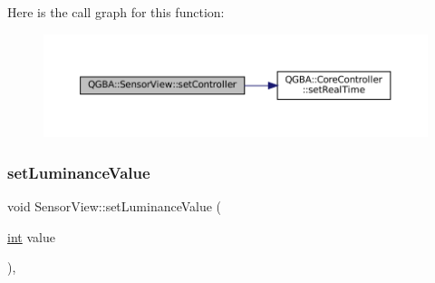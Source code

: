 Here is the call graph for this function\+:
\nopagebreak
\begin{figure}[H]
\begin{center}
\leavevmode
\includegraphics[width=350pt]{class_q_g_b_a_1_1_sensor_view_aef94bd97606a185f823636106bd0b2ca_cgraph}
\end{center}
\end{figure}
\mbox{\label{class_q_g_b_a_1_1_sensor_view_ad6dec39ee47c69c736c18293da18527c}} 
\subsubsection{\texorpdfstring{set\+Luminance\+Value}{setLuminanceValue}}
{\footnotesize\ttfamily void Sensor\+View\+::set\+Luminance\+Value (\begin{DoxyParamCaption}\item[{\mbox{\hyperlink{ioapi_8h_a787fa3cf048117ba7123753c1e74fcd6}{int}}}]{value }\end{DoxyParamCaption})\hspace{0.3cm}{\ttfamily [private]}, {\ttfamily [slot]}}

